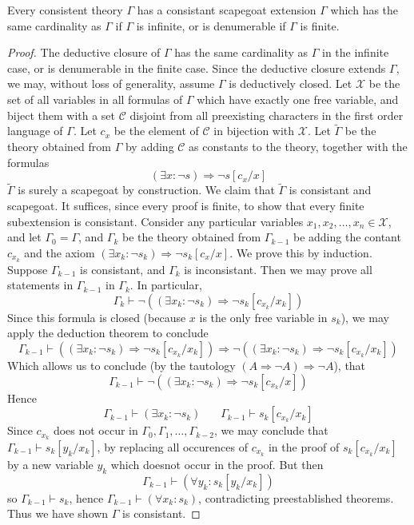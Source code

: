 \begin{lemma}
    Every consistent theory $\Gamma$ has a consistant scapegoat extension $\Gamma$ which has the same cardinality as $\Gamma$ if $\Gamma$ is infinite, or is denumerable if $\Gamma$ is finite.
\end{lemma}
\begin{proof}
    The deductive closure of $\Gamma$ has the same cardinality as $\Gamma$ in the infinite case, or is denumerable in the finite case. Since the deductive closure extends $\Gamma$, we may, without loss of generality, assume $\Gamma$ is deductively closed. Let $\mathcal{X}$ be the set of all variables in all formulas of $\Gamma$ which have exactly one free variable, and biject them with a set $\mathcal{C}$ disjoint from all preexisting characters in the first order language of $\Gamma$. Let $c_x$ be the element of $\mathcal{C}$ in bijection with $\mathcal{X}$. Let $\tilde{\Gamma}$ be the theory obtained from $\Gamma$ by adding $\mathcal{C}$ as constants to the theory, together with the formulas
    \[ (\exists x: \neg s) \Rightarrow \neg s[c_x/x] \]
    $\tilde{\Gamma}$ is surely a scapegoat by construction. We claim that $\tilde{\Gamma}$ is consistant and scapegoat. It suffices, since every proof is finite, to show that every finite subextension is consistant. Consider any particular variables $x_1, x_2, \dots, x_n \in \mathcal{X}$, and let $\Gamma_0 = \Gamma$, and $\Gamma_k$ be the theory obtained from $\Gamma_{k-1}$ be adding the contant $c_{x_k}$ and the axiom $(\exists x_k: \neg s_k) \Rightarrow \neg s_k[c_x/x]$. We prove this by induction. Suppose $\Gamma_{k-1}$ is consistant, and $\Gamma_k$ is inconsistant. Then we may prove all statements in $\Gamma_{k-1}$ in $\Gamma_k$. In particular,
    \[ \Gamma_k \vdash \neg ((\exists x_k: \neg s_k) \Rightarrow \neg s_k[c_{x_k}/x_k]) \]
    Since this formula is closed (because $x$ is the only free variable in $s_k$), we may apply the deduction theorem to conclude
    \[ \Gamma_{k-1} \vdash ((\exists x_k: \neg s_k) \Rightarrow \neg s_k[c_{x_k}/x_k]) \Rightarrow \neg ((\exists x_k: \neg s_k) \Rightarrow \neg s_k[c_{x_k}/x_k]) \]
    Which allows us to conclude (by the tautology $(A \Rightarrow \neg A) \Rightarrow \neg A$), that
    \[ \Gamma_{k-1} \vdash \neg ((\exists x_k: \neg s_k) \Rightarrow \neg s_k[c_{x_k}/x]) \]
    Hence
    \[ \Gamma_{k-1} \vdash (\exists x_k: \neg s_k)\ \ \ \ \ \ \ \ \Gamma_{k-1} \vdash s_k[c_{x_k}/x_k] \]
    Since $c_{x_k}$ does not occur in $\Gamma_0, \Gamma_1, \dots, \Gamma_{k-2}$, we may conclude that $\Gamma_{k-1} \vdash s_k[y_k/x_k]$, by replacing all occurences of $c_{x_k}$ in the proof of $s_k[c_{x_k}/x_k]$ by a new variable $y_k$ which doesnot occur in the proof. But then
    \[ \Gamma_{k-1} \vdash (\forall y_k: s_k[y_k/x_k]) \]
    so $\Gamma_{k-1} \vdash s_k$, hence $\Gamma_{k-1} \vdash (\forall x_k: s_k)$, contradicting preestablished theorems. Thus we have shown $\Gamma$ is consistant.
\end{proof}

